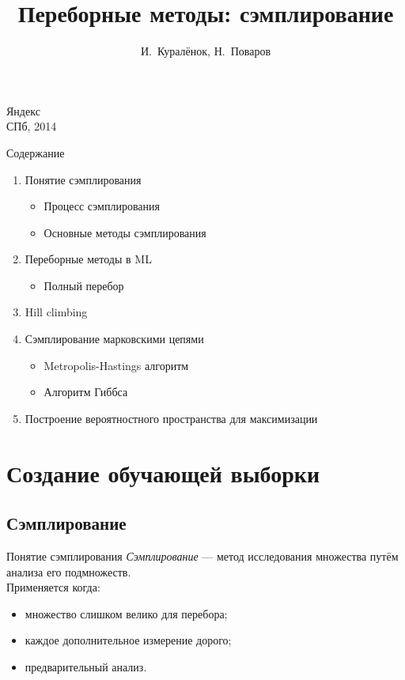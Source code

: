\documentclass[14pt, fleqn, xcolor={dvipsnames, table}]{beamer}
\title{Переборные методы: сэмплирование\\\small{}}
\author[]{\small{%
И.~Куралёнок,
Н.~Поваров}}
\date{}
\begin{document}
\begin{frame}
\maketitle
\small
\begin{center}
\vspace{-60pt}
\normalsize {\color{red}Я}ндекс \\
\vspace{80pt}
\footnotesize СПб, 2014
\end{center}
\end{frame}

\begin{frame}{Содержание}
\begin{enumerate}
  \item Понятие сэмплирования
  \begin{itemize}
   \item Процесс сэмплирования
   \item Основные методы сэмплирования
  \end{itemize}
  \item Переборные методы в ML
  \begin{itemize}
   \item Полный перебор
  \end{itemize}
  \item Hill climbing
  \item Сэмплирование марковскими цепями
  \begin{itemize}
   \item Metropolis-Hastings алгоритм
   \item Алгоритм Гиббса
  \end{itemize}
  \item Построение вероятностного пространства для максимизации
\end{enumerate}
\end{frame}

\section{Создание обучающей выборки}

\subsection{Сэмплирование}
\begin{frame}{Понятие сэмплирования}
\textit{Сэмплирование} --- метод исследования множества путём анализа его подмножеств. \\
Применяется когда:
\begin{itemize}
   \item множество слишком велико для перебора;
   \item каждое дополнительное измерение дорого;
   \item предварительный анализ.
\end{itemize}
\end{frame}
\end{document}
